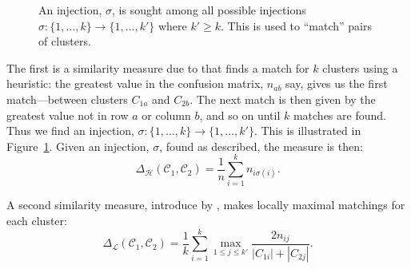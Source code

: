\documentclass[a4paper]{report}
\newcommand{\clus}{\mathcal{C}}
\newcommand{\partcompare}[1]{\Delta_{\mathcal{#1}}(\clus_1,\clus_2)}
\begin{document}
\begin{figure}
  \Centering
  \caption{An injection, $\sigma$, is sought among all possible injections
    $\sigma \colon \{1,\dotsc,k\} \to \{1,\dotsc,k'\}$ where $k' \geq k$.
    This is used to ``match'' pairs of clusters.}
  \label{fig:matching}
\end{figure}

The first is a similarity measure due to \citet{meila-2001} that finds a
match for $k$ clusters using a heuristic: the greatest value in the confusion
matrix, $n_{ab}$ say, gives us the first match---between clusters $C_{1a}$ and
$C_{2b}$.  The next match is then given by the greatest value not in row $a$
or column $b$, and so on until $k$ matches are found.  Thus we find an
injection, $\sigma \colon \{1,\dotsc,k\} \to \{1,\dotsc,k'\}$.  This is
illustrated in Figure~\ref{fig:matching}.  Given an injection, $\sigma$, found
as described, the measure is then:
\begin{equation*}
  \partcompare{H} = \frac{1}{n} \sum_{i=1}^{k} n_{i \sigma(i)}.
\end{equation*}

A second similarity measure, introduce by \citet{larsen-aone-1999}, makes
locally maximal matchings for each cluster:
\begin{equation*}
  \partcompare{L} = \frac{1}{k} \sum_{i=1}^{k} \max_{1 \leq j \leq k'}
                                             \frac{2n_{ij}}{|C_{1i}|+|C_{2j}|}.
\end{equation*}
\end{document}
